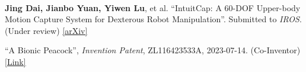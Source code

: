 
\begin{cventries}
    \vspace{-2mm}
    \cventry
    {} %
    {\ } %
    {\ } %
    {} %
    {
        \vspace{-8mm}
        \begin{cvitemize2}
            \item \textbf{Jing Dai, Jianbo Yuan, Yiwen Lu}, et al. ``IntuitCap: A 60-DOF Upper-body Motion Capture System for Dexterous Robot Manipulation''. Submitted to \textit{IROS}. (Under review) \href{https://arxiv.org/abs/xxxx.xxxxx}{\textcolor{link}{[arXiv]}} %
            \vspace{1mm}
            \item ``A Bionic Peacock'', \textit{Invention Patent}, ZL116423533A, 2023-07-14. (Co-Inventor) \href{https://pss-system.cponline.cnipa.gov.cn/documents/detail?prevPageTit=changgui}{\textcolor{link}{[Link]}}
        \end{cvitemize2}
        \vspace{3mm}
    }
\end{cventries}
